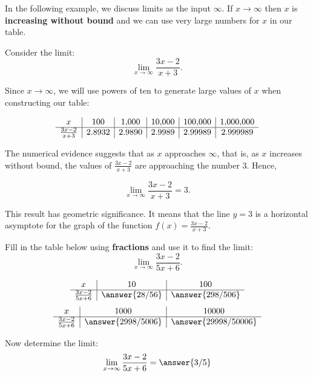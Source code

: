 \documentclass[handout]{ximera}
\begin{document}
In the following example, we discuss limits as the input $\infty$.
If $x \to \infty$ then $x$ is \textbf{increasing without bound} and we can use very large numbers for $x$ in our table.

\begin{example}[example 6]
Consider the limit:
\[\lim_{x \to \infty} \frac{3x -2}{x + 3}. \]

Since $x \to \infty$, we will use powers of ten to generate large values of $x$ when constructing 
our table: 

\[
\begin{array}{ c | c | c | c | c|c}
  x & 100 & 1{,}000 & 10{,}000 & 100{,}000 & 1{,}000{,}000\\ 
	\hline
	 \frac{3x-2}{x+3} & 2.8932 & 2.9890 & 2.9989 & 2.99989 & 2.999989
	\end{array}
\] 

The numerical evidence suggests that as $x$ approaches $\infty$, that is, 
as $x$ increases without bound, the values of $\frac{3x -2}{x +3}$ are approaching the number $3$. Hence,



\[\lim_{x \to \infty} \frac{3x -2}{x +3} = 3. \]

This result has geometric significance.  It means that the line $y = 3$ is a horizontal 
asymptote for the graph of the function $f(x) = \frac{3x -2}{x +3}.$
\end{example}


\begin{problem}[problem 6]
Fill in the table below using \textbf{fractions} and use it to find the limit:
\[\lim_{x \to \infty} \frac{3x-2}{5x+6}.\]

\begin{prompt}
\begin{center}
\[
\begin{array}{ c | c | c }
  x & 10 & 100   \\ 
	\hline 
	 \frac{3x-2}{5x+6} & \answer{28/56} & \answer{298/506} 
\end{array}
\]
\[
\begin{array}{ c | c | c  }
  x  & 1000 & 10000 \\ 
	\hline 
	 \frac{3x-2}{5x+6}  & \answer{2998/5006} & \answer{29998/50006}
\end{array}
\]
\end{center}
Now determine the limit:
\[
\lim_{x \to \infty} \frac{3x-2}{5x+6} = \answer{3/5}
\]
\end{prompt}
\end{problem}
\end{document}
